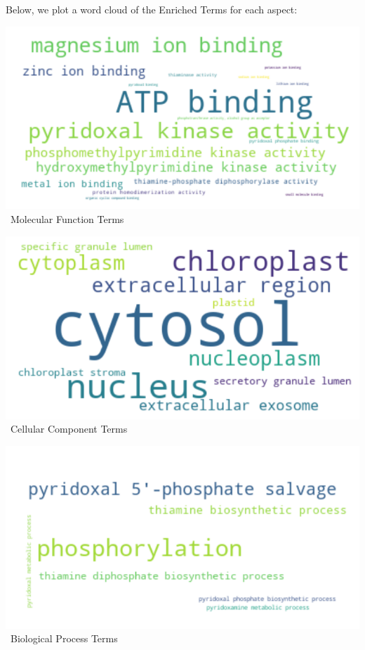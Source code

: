 \documentclass[10pt,twocolumn,letterpaper]{article}
\begin{document}
Below, we plot a word cloud of the Enriched Terms for each aspect:

\begin{center}
    \includegraphics[scale=0.35]{report/img/word_cloud_mf.png} 
    \
    \small{Molecular Function Terms}
\end{center}

\begin{center}
    \includegraphics[scale=0.35]{report/img/word_cloud_cc.png} 
    \
    \small{Cellular Component Terms}
\end{center}

\begin{center}
    \includegraphics[scale=0.35]{report/img/word_cloud_bp.png} 
    \
    \small{Biological Process Terms}
\end{center} \\
\end{document}
